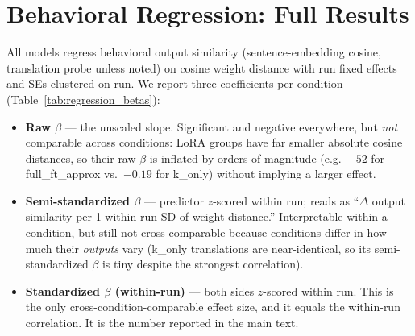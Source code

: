 \documentclass{article}
\theoremstyle{definition}
\theoremstyle{plain}
\begin{document}
\section{Behavioral Regression: Full Results}
\label{app:regression}

All models regress behavioral output similarity (sentence-embedding cosine, translation probe
unless noted) on cosine weight distance with run fixed effects and SEs clustered on run. We report
three coefficients per condition (Table~\ref{tab:regression_betas}):
\begin{itemize}
  \item \textbf{Raw $\beta$} --- the unscaled slope. Significant and negative everywhere, but
    \emph{not} comparable across conditions: LoRA groups have far smaller absolute cosine distances,
    so their raw $\beta$ is inflated by orders of magnitude (e.g.\ $-52$ for full\_ft\_approx vs.\
    $-0.19$ for k\_only) without implying a larger effect.
  \item \textbf{Semi-standardized $\beta$} --- predictor $z$-scored within run; reads as ``$\Delta$
    output similarity per 1 within-run SD of weight distance.'' Interpretable within a condition,
    but still not cross-comparable because conditions differ in how much their \emph{outputs} vary
    (k\_only translations are near-identical, so its semi-standardized $\beta$ is tiny despite the
    strongest correlation).
  \item \textbf{Standardized $\beta$ (within-run)} --- both sides $z$-scored within run. This is the
    only cross-condition-comparable effect size, and it equals the within-run correlation. It is the
    number reported in the main text.
\end{itemize}
\end{document}
